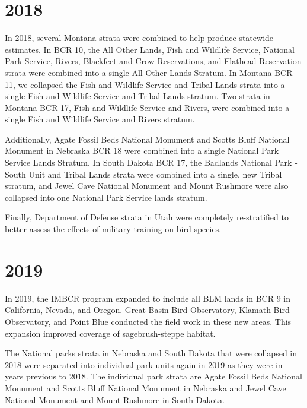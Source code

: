 \documentclass[
  letterpaper,
  DIV=11,
  numbers=noendperiod,
  oneside]{scrreprt}
\begin{document}
\hypertarget{section-9}{%
\section*{\texorpdfstring{\textbf{2018}}{2018}}\label{section-9}}


In 2018, several Montana strata were combined to help produce statewide
estimates. In BCR 10, the All Other Lands, Fish and Wildlife Service,
National Park Service, Rivers, Blackfeet and Crow Reservations, and
Flathead Reservation strata were combined into a single All Other Lands
Stratum. In Montana BCR 11, we collapsed the Fish and Wildlife Service
and Tribal Lands strata into a single Fish and Wildlife Service and
Tribal Lands stratum. Two strata in Montana BCR 17, Fish and Wildlife
Service and Rivers, were combined into a single Fish and Wildlife
Service and Rivers stratum.

Additionally, Agate Fossil Beds National Monument and Scotts Bluff
National Monument in Nebraska BCR 18 were combined into a single
National Park Service Lands Stratum. In South Dakota BCR 17, the
Badlands National Park - South Unit and Tribal Lands strata were
combined into a single, new Tribal stratum, and Jewel Cave National
Monument and Mount Rushmore were also collapsed into one National Park
Service lands stratum.

Finally, Department of Defense strata in Utah were completely
re-stratified to better assess the effects of military training on bird
species.

\hypertarget{section-10}{%
\section*{\texorpdfstring{\textbf{2019}}{2019}}\label{section-10}}


In 2019, the IMBCR program expanded to include all BLM lands in BCR 9 in
California, Nevada, and Oregon. Great Basin Bird Observatory, Klamath
Bird Observatory, and Point Blue conducted the field work in these new
areas. This expansion improved coverage of sagebrush-steppe habitat.

The National parks strata in Nebraska and South Dakota that were
collapsed in 2018 were separated into individual park units again in
2019 as they were in years previous to 2018. The individual park strata
are Agate Fossil Beds National Monument and Scotts Bluff National
Monument in Nebraska and Jewel Cave National Monument and Mount Rushmore
in South Dakota.
\end{document}
